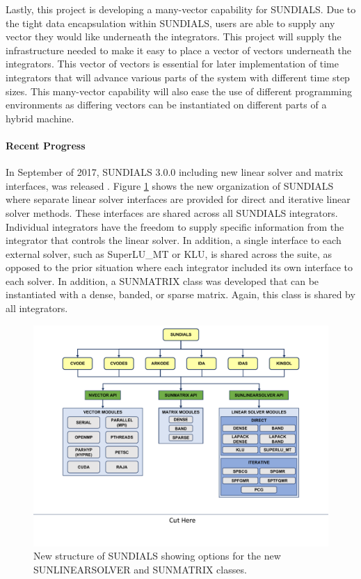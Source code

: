 Lastly, this project is developing a many-vector capability for SUNDIALS.  Due to the tight data encapsulation within SUNDIALS, users are able to supply any vector they would like underneath the integrators.  This project will supply the infrastructure needed to make it easy to place a vector of vectors underneath the integrators.  This vector of vectors is essential for later implementation of time integrators that will advance various parts of the system with different time step sizes.  This many-vector capability will also ease the use of different programming environments as differing vectors can be instantiated on different parts of a hybrid machine. 

\paragraph{Recent Progress}

In September of 2017, SUNDIALS 3.0.0 including new linear solver and matrix interfaces, was released \cite{SUNDIALSweb}.  Figure \ref{fig:sunorg1} shows the new organization of SUNDIALS where separate linear solver interfaces are provided for direct and iterative linear solver methods.  These interfaces are shared across all SUNDIALS integrators.  Individual integrators have the freedom to supply specific information from the integrator that controls the linear solver.  In addition, a single interface to each external solver, such as SuperLU\_MT or KLU, is shared across the suite, as opposed to the prior situation where each integrator included its own interface to each solver.  In addition, a SUNMATRIX class was developed that can be instantiated with a dense, banded, or sparse matrix.  Again, this class is shared by all integrators.  

\begin{figure}[htb]
	\centering
	\includegraphics[width=6in]{projects/2.3.3-MathLibs/2.3.3.05-SUNDIALS/sunorg1.pdf}
	\caption{\label{fig:sunorg1}New structure of SUNDIALS showing options for the new SUNLINEARSOLVER and SUNMATRIX classes.}
\end{figure}

